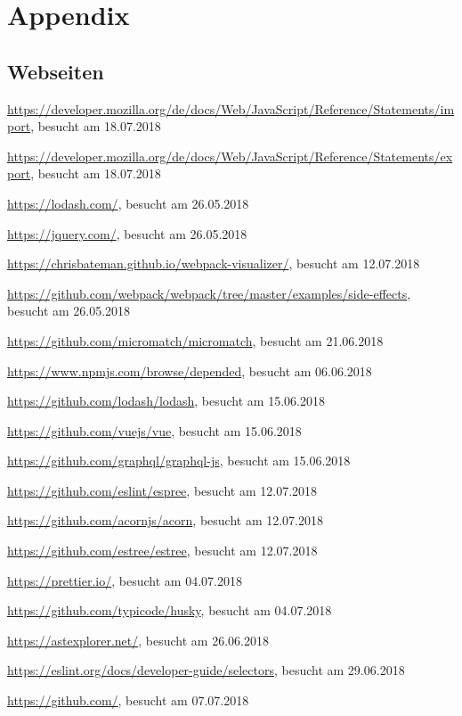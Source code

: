 \appendix

\section*{Appendix}
\renewcommand{\thesubsection}{\Alph{subsection}}

\subsection{Webseiten}
\url{https://developer.mozilla.org/de/docs/Web/JavaScript/Reference/Statements/import}, besucht am 18.07.2018 

\url{https://developer.mozilla.org/de/docs/Web/JavaScript/Reference/Statements/export}, besucht am 18.07.2018

\url{https://lodash.com/}, besucht am 26.05.2018 

\url{https://jquery.com/}, besucht am 26.05.2018

\url{https://chrisbateman.github.io/webpack-visualizer/}, besucht am 12.07.2018

\url{https://github.com/webpack/webpack/tree/master/examples/side-effects}, besucht am 26.05.2018

\url{https://github.com/micromatch/micromatch}, besucht am 21.06.2018

\url{https://www.npmjs.com/browse/depended}, besucht am 06.06.2018

\url{https://github.com/lodash/lodash}, besucht am 15.06.2018

\url{https://github.com/vuejs/vue}, besucht am 15.06.2018

\url{https://github.com/graphql/graphql-js}, besucht am 15.06.2018

\url{https://github.com/eslint/espree}, besucht am 12.07.2018

\url{https://github.com/acornjs/acorn}, besucht am 12.07.2018

\url{https://github.com/estree/estree}, besucht am 12.07.2018

\url{https://prettier.io/}, besucht am 04.07.2018

\url{https://github.com/typicode/husky}, besucht am 04.07.2018

\url{https://astexplorer.net/}, besucht am 26.06.2018

\url{https://eslint.org/docs/developer-guide/selectors}, besucht am 29.06.2018

\url{https://github.com/}, besucht am 07.07.2018 

